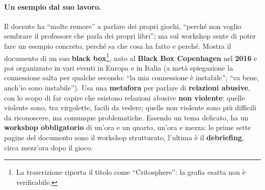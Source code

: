 \paragraph{Un esempio dal suo lavoro.} Il docente ha ``molte remore'' a parlare dei
propri giochi, ``perché non voglio sembrare il professore che parla dei propri libri'';
ma sul workshop sente di poter fare un esempio concreto, perché sa che cosa ha fatto e
perché. Mostra il documento di un suo \textbf{black box}\footnote{La trascrizione
riporta il titolo come ``Critosphere'': la grafia esatta non è verificabile.}, nato
al \textbf{Black Box Copenhagen} nel \textbf{2016} e poi organizzato in vari eventi
in Europa e in Italia (a metà spiegazione la connessione salta per qualche secondo:
``la mia connessione è instabile''; ``va bene, anch'io sono instabile''). Usa una
\textbf{metafora} per parlare di \textbf{relazioni abusive}, con lo scopo di far capire
che esistono relazioni abusive \textbf{non violente}: quelle violente sono, tra
virgolette, facili da vedere; quelle non violente sono più difficili da riconoscere, ma
comunque problematiche. Essendo un tema delicato, ha un \textbf{workshop
obbligatorio} di un'ora e un quarto, un'ora e mezza: le prime sette pagine del
documento sono il workshop strutturato, l'ultima è il \textbf{debriefing}, circa
mezz'ora dopo il gioco.

